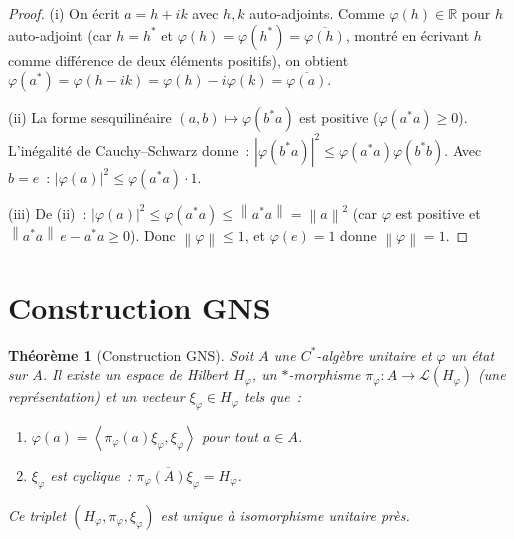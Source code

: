 \documentclass[a4paper,12pt]{book}
\newcommand{\R}{\mathbb{R}}
\newcommand{\norm}[1]{\left\| #1 \right\|}
\newcommand{\abs}[1]{\left| #1 \right|}
\newcommand{\inner}[2]{\left\langle #1, #2 \right\rangle}
\theoremstyle{definition}
\theoremstyle{plain}
\newtheorem{theoreme}[definition]{Théorème}
\theoremstyle{remark}
\begin{document}
\begin{proof}
(i) On écrit $a = h + ik$ avec $h, k$ auto-adjoints. Comme $\varphi(h) \in \R$ pour $h$
auto-adjoint (car $h = h^*$ et $\varphi(h) = \varphi(h^*) = \overline{\varphi(h)}$, montré en écrivant $h$ comme différence de deux éléments positifs), on obtient
$\varphi(a^*) = \varphi(h - ik) = \varphi(h) - i\varphi(k) = \overline{\varphi(a)}$.

(ii) La forme sesquilinéaire $(a,b) \mapsto \varphi(b^*a)$ est positive
($\varphi(a^*a) \ge 0$). L'inégalité de Cauchy--Schwarz donne~:
$\abs{\varphi(b^*a)}^2 \le \varphi(a^*a)\varphi(b^*b)$. Avec $b = e$~:
$\abs{\varphi(a)}^2 \le \varphi(a^*a) \cdot 1$.

(iii) De (ii)~: $\abs{\varphi(a)}^2 \le \varphi(a^*a) \le \norm{a^*a} = \norm{a}^2$
(car $\varphi$ est positive et $\norm{a^*a}\,e - a^*a \ge 0$). Donc
$\norm{\varphi} \le 1$, et $\varphi(e) = 1$ donne $\norm{\varphi} = 1$.
\end{proof}

\section{Construction GNS}

\begin{theoreme}[Construction GNS]
\label{thm:gns}
Soit $A$ une $C^*$-algèbre unitaire et $\varphi$ un état sur $A$. Il existe un espace de
Hilbert $H_\varphi$, un $*$-morphisme $\pi_\varphi : A \to \mathcal{L}(H_\varphi)$
(une \emph{représentation}) et un vecteur $\xi_\varphi \in H_\varphi$ tels que~:
\begin{enumerate}[label=(\roman*)]
  \item $\varphi(a) = \inner{\pi_\varphi(a)\xi_\varphi}{\xi_\varphi}$ pour tout $a \in A$.
  \item $\xi_\varphi$ est \emph{cyclique}~:
        $\overline{\pi_\varphi(A)\xi_\varphi} = H_\varphi$.
\end{enumerate}
Ce triplet $(H_\varphi, \pi_\varphi, \xi_\varphi)$ est unique à isomorphisme unitaire
près.
\end{theoreme}
\end{document}
